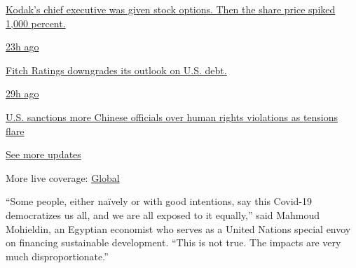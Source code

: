 \href{https://www.nytimes3xbfgragh.onion/live/2020/07/31/business/stock-market-today-coronavirus?action=click\&pgtype=Article\&state=default\&region=MAIN_CONTENT_1\&context=storylines_live_updates\#kodaks-chief-executive-was-given-stock-options-then-the-share-price-spiked-1000-percent}{Kodak's
chief executive was given stock options. Then the share price spiked
1,000 percent.}

\href{https://www.nytimes3xbfgragh.onion/live/2020/07/31/business/stock-market-today-coronavirus?action=click\&pgtype=Article\&state=default\&region=MAIN_CONTENT_1\&context=storylines_live_updates\#fitch-ratings-downgrades-its-outlook-on-us-debt}{23h
ago}

\href{https://www.nytimes3xbfgragh.onion/live/2020/07/31/business/stock-market-today-coronavirus?action=click\&pgtype=Article\&state=default\&region=MAIN_CONTENT_1\&context=storylines_live_updates\#fitch-ratings-downgrades-its-outlook-on-us-debt}{Fitch
Ratings downgrades its outlook on U.S. debt.}

\href{https://www.nytimes3xbfgragh.onion/live/2020/07/31/business/stock-market-today-coronavirus?action=click\&pgtype=Article\&state=default\&region=MAIN_CONTENT_1\&context=storylines_live_updates\#us-sanctions-more-chinese-officials-over-human-rights-violations-as-tensions-flare}{29h
ago}

\href{https://www.nytimes3xbfgragh.onion/live/2020/07/31/business/stock-market-today-coronavirus?action=click\&pgtype=Article\&state=default\&region=MAIN_CONTENT_1\&context=storylines_live_updates\#us-sanctions-more-chinese-officials-over-human-rights-violations-as-tensions-flare}{U.S.
sanctions more Chinese officials over human rights violations as
tensions flare}

\href{https://www.nytimes3xbfgragh.onion/live/2020/07/31/business/stock-market-today-coronavirus?action=click\&pgtype=Article\&state=default\&region=MAIN_CONTENT_1\&context=storylines_live_updates}{See
more updates}

More live coverage:
\href{https://www.nytimes3xbfgragh.onion/2020/08/01/world/coronavirus-covid-19.html?action=click\&pgtype=Article\&state=default\&region=MAIN_CONTENT_1\&context=storylines_live_updates}{Global}

``Some people, either naïvely or with good intentions, say this Covid-19
democratizes us all, and we are all exposed to it equally,'' said
Mahmoud Mohieldin, an Egyptian economist who serves as a United Nations
special envoy on financing sustainable development. ``This is not true.
The impacts are very much disproportionate.''

